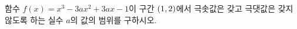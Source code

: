 함수 $f(x)=x^3-3ax^2+3ax-1$이 구간 $(1{,}\mkern3mu\mathopen{}2)$에서 극솟값은 갖고 극댓값은 갖지 않도록 하는 실수 $a$의 값의 범위를 구하시오.

